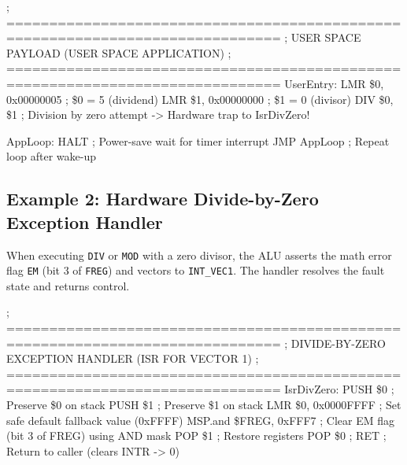 \documentclass[11pt,a4paper]{article}
\newcommand{\reg}{\$}
\newcommand{\regFREG}{\$FREG}
\begin{document}
\begin{examplebox}[title={Listing: Cold Boot and Hardware Initialization (startup.asm)},top=2.5pt,bottom=2.5pt,unbreakable]
\begin{limasm}
; ==============================================================================
; USER SPACE PAYLOAD (USER SPACE APPLICATION)
; ==============================================================================
UserEntry:
    LMR         \reg0, 0x00000005           ; \reg0 = 5 (dividend)
    LMR         \reg1, 0x00000000           ; \reg1 = 0 (divisor)
    DIV         \reg0, \reg1                ; Division by zero attempt -> Hardware trap to IsrDivZero!

AppLoop:
    HALT                                    ; Power-save wait for timer interrupt
    JMP         AppLoop                     ; Repeat loop after wake-up
\end{limasm}
\end{examplebox}

\clearpage

\subsection{Example 2: Hardware Divide-by-Zero Exception Handler}

When executing \texttt{DIV} or \texttt{MOD} with a zero divisor, the ALU asserts the math error flag \texttt{EM} (bit 3 of \texttt{FREG}) and vectors to \texttt{INT\_VEC1}. The handler resolves the fault state and returns control.

\begin{examplebox}[title={Listing: Divide-by-Zero Exception Handler (div\_zero.asm)},top=2.5pt,bottom=2.5pt,unbreakable]
\begin{limasm}
; ==============================================================================
; DIVIDE-BY-ZERO EXCEPTION HANDLER (ISR FOR VECTOR 1)
; ==============================================================================
IsrDivZero:
    PUSH        \reg0                       ; Preserve \reg0 on stack
    PUSH        \reg1                       ; Preserve \reg1 on stack
    LMR         \reg0, 0x0000FFFF           ; Set safe default fallback value (0xFFFF)
    MSP.and     \regFREG, 0xFFF7            ; Clear EM flag (bit 3 of FREG) using AND mask
    POP         \reg1                       ; Restore registers
    POP         \reg0                       ;
    RET                                     ; Return to caller (clears INTR -> 0)
\end{limasm}
\end{examplebox}

\vspace{2mm}
\end{document}
